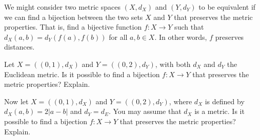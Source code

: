 \begin{activity} We might consider two metric spaces $(X, d_X)$ and $(Y, d_Y)$ to be equivalent if we can find a bijection between the two sets $X$ and $Y$ that preserves the metric properties. That is, find a bijective function $f : X \to Y$ such that $d_X(a,b) = d_Y(f(a), f(b))$ for all $a,b \in X$. In other words, $f$ preserves distances. 
	\ba
	\item Let $X = ((0,1), d_X)$ and $Y = ((0,2), d_Y)$, with both $d_X$ and $d_Y$ the Euclidean metric. Is it possible to find a bijection $f : X \to Y$ that preserves the metric properties? Explain. 
	
\item Now let $X = ((0,1), d_X)$ and $Y = ((0,2), d_Y)$, where $d_X$ is defined by $d_X(a,b) = 2 | a-b |$ and $d_Y = d_E$. You may assume that $d_X$ is a metric. Is it possible to find a bijection $f : X \to Y$ that preserves the metric properties? Explain. 

	\ea

\end{activity}

\begin{comment}

\ActivitySolution
	\ba
	\item The answer is no. Suppose to the contrary that there is a bijective function $f: (0,1) \to (0,2)$ so that 
\[d_X(a,b) = d_Y(f(a), f(b))\]
for all $a,b \in X$. Let $u, v \in Y$. The surjectivity of $f$ implies that there exists $a,b \in X$ such that $f(a) = u$ and $f(b) = v$. Then
\[| u - v | = | f(a) - f(b) | = | a-b| \leq 1.\]
So $| u-v | \leq 1$ for all $u, v \in Y$. But $1.75$ and $0.25$ are in $Y$ and 
\[| 1.75-0.25 | = 1.5 > 1.\]
So no such function can exist. 


\item  The answer is yes. Let $f:X \to Y$ be defined by $f(x) = 2x$. We will show that $f$ is an injection. Let $a_1, a_2 \in X$ and assume $f(a_1) = f(a_2)$. Then $2a_1 = 2a_2$ from which it follows that $a_1 = a_2$. So $f$ is an injection. Let $y \in Y$. Then $0 < y < 2$. So $0 < \frac{y}{2} < 1$ and $\frac{y}{2} \in X$. Since 
\[f\left(\frac{y}{2}\right) = 2\left(\frac{y}{2}\right) = y,\]
we see that $f$ is a surjection. Thus, $f$ is a bijection. 

Finally, let $a, b \in X$. Then
\[d_Y(f(a),f(b)) = | 2a-2b | = 2| a-b | = d_X(a,b).\]
So $f$ preserves distances. 

	\ea


\end{comment}

